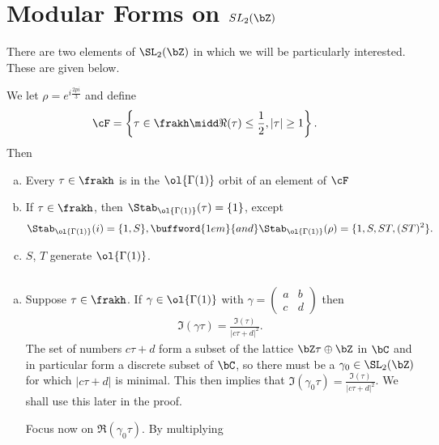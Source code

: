 \section{Modular Forms on \texorpdfstring{$SL_2(\bZ)$}{the Special Linear Group}}
There are two elements of $\SL_2(\bZ)$ in which we will be particularly interested. These are given below.
\begin{equation}\label{eqn:S-T_matrices}
	
\end{equation}
\begin{thm}\label{thm:fund-domain-SL2}
	We let $\rho = e^{i\frac{2pi}{3}}$ and define
	\begin{align*}
		\cF &= \left\{\tau \in \frakh \midd \Re(\tau) \leq \frac{1}{2}, |\tau| \geq 1\right\}.
	\end{align*}
	Then
	\begin{enumerate}[(a)]
		\item Every $\tau \in \frakh$ is in the $\ol{\Gamma(1)}$ orbit of an element of $\cF$
		\item If $\tau \in \frakh$, then $\Stab_{\ol{\Gamma(1)}}(\tau) = \{1\}$, except
			\begin{align*}
				\Stab_{\ol{\Gamma(1)}}(i) = \{1, S\}, \buffword{1em}{and} \Stab_{\ol{\Gamma(1)}}(\rho) = \{1, S, ST, (ST)^2\}.
			\end{align*}
		\item $S$, $T$ generate $\ol{\Gamma(1)}$.
	\end{enumerate}
\end{thm}
\begin{prf}$ $
	\begin{enumerate}[(a)]
		\item Suppose $\tau \in \frakh$. If $\gamma \in \ol{\Gamma(1)}$ with $\gamma = \begin{pmatrix} a & b \\ c & d \end{pmatrix}$ then
			\begin{align*}
				\Im(\gamma \tau) = \frac{\Im(\tau)}{|c\tau + d|^2}.
			\end{align*}
			 The set of numbers $c\tau + d$ form a subset of the lattice $\bZ \tau \oplus \bZ$ in $\bC$ and in particular form a discrete subset of $\bC$, so there must be a  $\gamma_0 \in \SL_2(\bZ)$ for which $|c\tau + d|$ is minimal. This then implies that $\Im(\gamma_0\tau) = \frac{\Im(\tau)}{|c\tau+d|^2}$. We shall use this later in the proof.

			 Focus now on $\Re(\gamma_0 \tau)$. By multiplying 
	\end{enumerate}
\end{prf}



